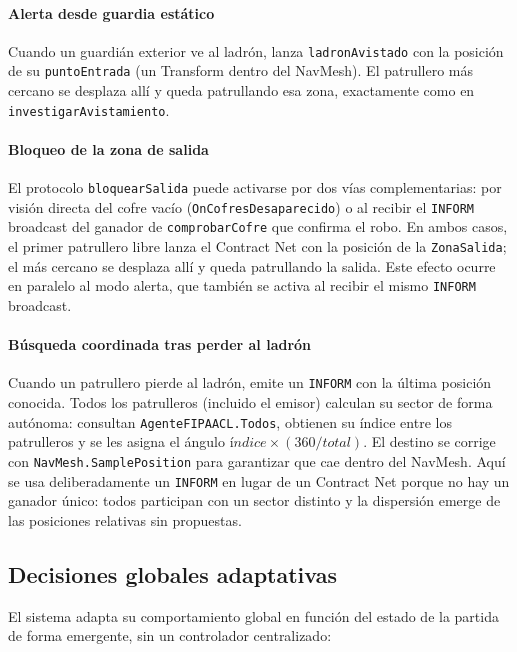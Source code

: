 \documentclass[a4paper,12pt]{article}
\begin{document}
\paragraph{Alerta desde guardia estático} Cuando un guardián exterior ve al ladrón, lanza \texttt{ladronAvistado} con la posición de su \texttt{puntoEntrada} (un Transform dentro del NavMesh). El patrullero más cercano se desplaza allí y queda patrullando esa zona, exactamente como en \texttt{investigarAvistamiento}.

\paragraph{Bloqueo de la zona de salida} El protocolo \texttt{bloquearSalida} puede activarse por dos vías complementarias: por visión directa del cofre vacío (\texttt{OnCofresDesaparecido}) o al recibir el \texttt{INFORM} broadcast del ganador de \texttt{comprobarCofre} que confirma el robo. En ambos casos, el primer patrullero libre lanza el Contract Net con la posición de la \texttt{ZonaSalida}; el más cercano se desplaza allí y queda patrullando la salida. Este efecto ocurre en paralelo al modo alerta, que también se activa al recibir el mismo \texttt{INFORM} broadcast.

\paragraph{Búsqueda coordinada tras perder al ladrón} Cuando un patrullero pierde al ladrón, emite un \texttt{INFORM} con la última posición conocida. Todos los patrulleros (incluido el emisor) calculan su sector de forma autónoma: consultan \texttt{AgenteFIPAACL.Todos}, obtienen su índice entre los patrulleros y se les asigna el ángulo $\textit{índice} \times (360 / \textit{total})$. El destino se corrige con \texttt{NavMesh.SamplePosition} para garantizar que cae dentro del NavMesh. Aquí se usa deliberadamente un \texttt{INFORM} en lugar de un Contract Net porque no hay un ganador único: todos participan con un sector distinto y la dispersión emerge de las posiciones relativas sin propuestas.

\subsection*{Decisiones globales adaptativas}

El sistema adapta su comportamiento global en función del estado de la partida de forma emergente, sin un controlador centralizado:
\end{document}
